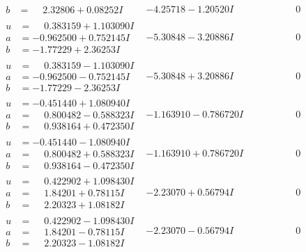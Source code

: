 \documentclass[1p]{elsarticle_modified}
\theoremstyle{definition}
\begin{document}
$$\begin{array}{c|c|c}
\begin{aligned}
b &= \phantom{-}2.32806 + 0.08252 I\end{aligned}
 & -4.25718 - 1.20520 I & \phantom{-0.000000 } 0 \\ \hline\begin{aligned}
u &= \phantom{-}0.383159 + 1.103090 I \\
a &= -0.962500 + 0.752145 I \\
b &= -1.77229 + 2.36253 I\end{aligned}
 & -5.30848 - 3.20886 I & \phantom{-0.000000 } 0 \\ \hline\begin{aligned}
u &= \phantom{-}0.383159 - 1.103090 I \\
a &= -0.962500 - 0.752145 I \\
b &= -1.77229 - 2.36253 I\end{aligned}
 & -5.30848 + 3.20886 I & \phantom{-0.000000 } 0 \\ \hline\begin{aligned}
u &= -0.451440 + 1.080940 I \\
a &= \phantom{-}0.800482 - 0.588323 I \\
b &= \phantom{-}0.938164 + 0.472350 I\end{aligned}
 & -1.163910 - 0.786720 I & \phantom{-0.000000 } 0 \\ \hline\begin{aligned}
u &= -0.451440 - 1.080940 I \\
a &= \phantom{-}0.800482 + 0.588323 I \\
b &= \phantom{-}0.938164 - 0.472350 I\end{aligned}
 & -1.163910 + 0.786720 I & \phantom{-0.000000 } 0 \\ \hline\begin{aligned}
u &= \phantom{-}0.422902 + 1.098430 I \\
a &= \phantom{-}1.84201 + 0.78115 I \\
b &= \phantom{-}2.20323 + 1.08182 I\end{aligned}
 & -2.23070 + 0.56794 I & \phantom{-0.000000 } 0 \\ \hline\begin{aligned}
u &= \phantom{-}0.422902 - 1.098430 I \\
a &= \phantom{-}1.84201 - 0.78115 I \\
b &= \phantom{-}2.20323 - 1.08182 I\end{aligned}
 & -2.23070 - 0.56794 I & \phantom{-0.000000 } 0 \\ \hline\begin{aligned}

\end{aligned}
\end{array}$$
\end{document}
